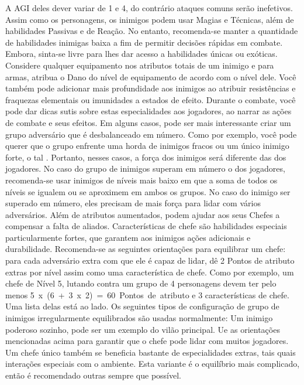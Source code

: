 A AGI deles dever variar de 1 e 4, do contrário ataques comuns serão inefetivos.
Assim como os personagens, os inimigos podem usar Magias e Técnicas, além de habilidades Passivas e de Reação.
No entanto, recomenda-se manter a quantidade de habilidades inimigas baixa a fim de permitir decisões rápidas em combate.
Embora, sinta-se livre para lhes dar acesso a habilidades únicas ou exóticas.
Considere qualquer equipamento nos atributos totais de um inimigo e para armas, atribua o Dano do nível de equipamento de acordo com o nível dele.
Você também pode adicionar mais profundidade aos inimigos ao atribuir resistências e fraquezas elementais ou imunidades a estados de efeito.
Durante o combate, você pode dar dicas sutis sobre estas especialidades aos jogadores, ao narrar as ações de combate e seus efeitos.
%
\vfill
%
Em alguns casos, pode ser mais interessante criar um grupo adversário que é desbalanceado em número.
Como por exemplo, você pode querer que o grupo enfrente uma horda de inimigos fracos ou um único inimigo forte, o tal .
Portanto, nesses casos, a força dos inimigos será diferente das dos jogadores.
No caso do grupo de inimigos superam em número o dos jogadores, recomenda-se usar inimigos de níveis mais baixo em que a soma de todos os níveis se igualem ou se aproximem em ambos os grupos.
No caso do inimigo ser superado em número, eles precisam de mais força para lidar com vários adversários.
Além de atributos aumentados,  podem ajudar aos seus Chefes a compensar a falta de aliados.
Características de chefe são habilidades especiais particularmente fortes, que garantem aos inimigos ações adicionais e durabilidade.
Recomenda-se as seguintes orientações para equilibrar um chefe: para cada adversário extra com que ele é capaz de lidar, dê 2 Pontos de atributo extras por nível assim como uma característica de chefe.
Como por exemplo, um chefe de Nível 5, lutando contra um grupo de 4 personagens devem ter pelo menos \mbox{5 x (6 + 3 x 2) = 60 Pontos de atributo} e 3 características de chefe.
Uma lista delas está ao lado.
%
\vfill
%
Os seguintes tipos de configuração de grupo de inimigos irregularmente equilibrados são usadas normalmente:
\ofrow
{}
Um inimigo poderoso sozinho, pode ser um exemplo do vilão principal.
Ue as orientações mencionadas acima para garantir que o chefe pode lidar com muitos jogadores.
Um chefe único também se beneficia bastante de especialidades extras, tais quais interações especiais com o ambiente.
Esta variante é o equilíbrio mais complicado, então é recomendado outras sempre que possível.
